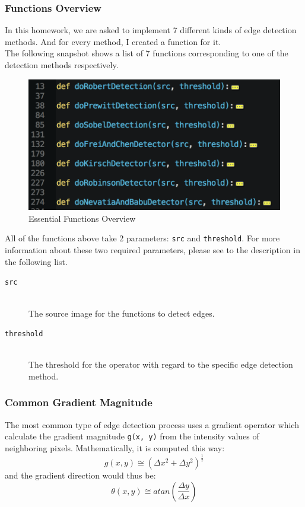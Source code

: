 \documentclass{article}
\newcommand{\code}[1]{\texttt{#1}}
\begin{document}
\subsubsection{Functions Overview}
In this homework, we are asked to implement 7 different kinds of edge detection methods. And for every method, I created a function for it. \\
The following snapshot shows a list of 7 functions corresponding to one of the detection methods respectively. \\
\begin{figure}[H]
  \includegraphics[width=\linewidth]{img/functions_overview.png}
  \caption{Essential Functions Overview}
  \label{fig:functions_overview}
\end{figure}
All of the functions above take 2 parameters: \code{src} and \code{threshold}. For more information about these two required parameters, please see to the description in the following list.
\begin{description}
  \item[\code{src}] \hfill \\
  The source image for the functions to detect edges.
  \item[\code{threshold}] \hfill \\
  The threshold for the operator with regard to the specific edge detection method.
\end{description}

\subsubsection{Common Gradient Magnitude}
The most common type of edge detection process uses a gradient operator which calculate the gradient magnitude \code{g(x, y)} from the intensity values of neighboring pixels. Mathematically, it is computed this way:
$$ g(x, y) \cong (\Delta x^{2} + \Delta y^{2})^{\frac{1}{2}} $$
and the gradient direction would thus be:
$$ \theta(x, y) \cong atan(\frac{\Delta y}{\Delta x}) $$
\end{document}
